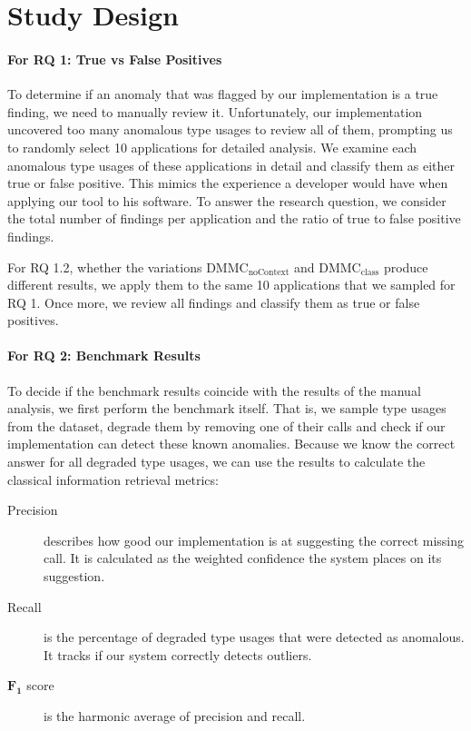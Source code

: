 \section{Study Design}

\paragraph{For RQ 1: True vs False Positives}

To determine if an anomaly that was flagged by our implementation is a true finding, we need to manually review it.
Unfortunately, our implementation uncovered too many anomalous type usages to review all of them, prompting us to randomly select 10 applications for detailed analysis.
We examine each anomalous type usages of these applications in detail and classify them as either true or false positive.
This mimics the experience a developer would have when applying our tool to his software.
To answer the research question, we consider the total number of findings per application and the ratio of true to false positive findings.

For RQ 1.2, whether the variations $\text{DMMC}_\text{noContext}$ and $\text{DMMC}_\text{class}$ produce different results, we apply them to the same 10 applications that we sampled for RQ 1.
Once more, we review all findings and classify them as true or false positives.

\paragraph{For RQ 2: Benchmark Results}

To decide if the benchmark results coincide with the results of the manual analysis, we first perform the benchmark itself.
That is, we sample type usages from the dataset, degrade them by removing one of their calls and check if our implementation can detect these known anomalies.
Because we know the correct answer for all degraded type usages, we can use the results to calculate the classical information retrieval metrics:
\begin{description}
    \item [Precision] describes how good our implementation is at suggesting the correct missing call. It is calculated as the weighted confidence the system places on its suggestion.
    \item [Recall] is the percentage of degraded type usages that were detected as anomalous. It tracks if our system correctly detects outliers.
    \item [$\mathbf{F_1}$ score] is the harmonic average of precision and recall.
\end{description}

